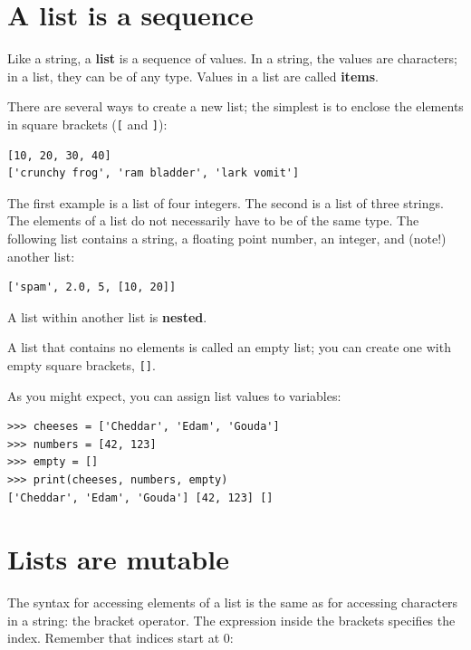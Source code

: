 \section{A list is a sequence}
\label{sequence}

Like a string, a \textbf{list} is a sequence of values. In a string, the values are characters; in a list, they can be of any type. Values in a list are called \textbf{items}.

There are several ways to create a new list; the simplest is to enclose the elements in square brackets (\verb"[" and \verb"]"):

\begin{Verbatim}[frame=single]
[10, 20, 30, 40]
['crunchy frog', 'ram bladder', 'lark vomit']
\end{Verbatim}
%
The first example is a list of four integers. The second is a list of three strings. The elements of a list do not necessarily have to be of the same type. The following list contains a string, a floating point number, an integer, and (note!) another list:

\begin{Verbatim}[frame=single]
['spam', 2.0, 5, [10, 20]]
\end{Verbatim}
%
A list within another list is \textbf{nested}.

A list that contains no elements is called an empty list; you can create one with empty square brackets, \verb"[]".

As you might expect, you can assign list values to variables:

\begin{Verbatim}[frame=single]
>>> cheeses = ['Cheddar', 'Edam', 'Gouda']
>>> numbers = [42, 123]
>>> empty = []
>>> print(cheeses, numbers, empty)
['Cheddar', 'Edam', 'Gouda'] [42, 123] []
\end{Verbatim}
%


\section{Lists are mutable}
\label{mutable}

The syntax for accessing elements of a list is the same as for accessing characters in a string: the bracket operator. The expression inside the brackets specifies the index. Remember that indices start at 0:

